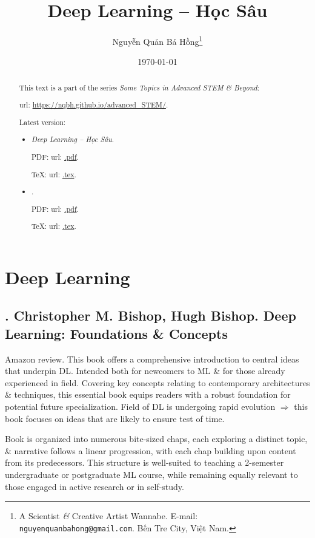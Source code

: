 \documentclass{article}
\title{Deep Learning -- Học Sâu}
\author{Nguyễn Quản Bá Hồng\footnote{A Scientist {\it\&} Creative Artist Wannabe. E-mail: {\tt nguyenquanbahong@gmail.com}. Bến Tre City, Việt Nam.}}
\date{\today}
\begin{document}
\maketitle
\begin{abstract}
	This text is a part of the series {\it Some Topics in Advanced STEM \& Beyond}:
	
	{\sc url}: \url{https://nqbh.github.io/advanced_STEM/}.
	
	Latest version:
	\begin{itemize}
		\item {\it Deep Learning -- Học Sâu}.
		
		PDF: {\sc url}: \url{.pdf}.
		
		\TeX: {\sc url}: \url{.tex}.
		\item {\it }.
		
		PDF: {\sc url}: \url{.pdf}.
		
		\TeX: {\sc url}: \url{.tex}.
	\end{itemize}
\end{abstract}
\tableofcontents


\section{Deep Learning}

\subsection{\cite{Bishop_Bishop2024}. {\sc Christopher M. Bishop, Hugh Bishop}. Deep Learning: Foundations \& Concepts}
{}

{\sf Amazon review.} This book offers a comprehensive introduction to central ideas that underpin DL. Intended both for newcomers to ML \& for those already experienced in field. Covering key concepts relating to contemporary architectures \& techniques, this essential book equips readers with a robust foundation for potential future specialization. Field of DL is undergoing rapid evolution $\Rightarrow$ this book focuses on ideas that are likely to ensure test of time.

Book is organized into numerous bite-sized chaps, each exploring a distinct topic, \& narrative follows a linear progression, with each chap building upon content from its predecessors. This structure is well-suited to teaching a 2-semester undergraduate or postgraduate ML course, while remaining equally relevant to those engaged in active research or in self-study.
\end{document}
